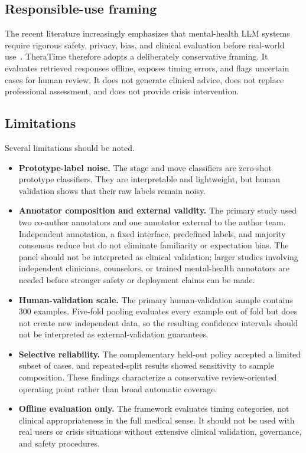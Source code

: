 \documentclass[preprint,12pt,a4paper]{elsarticle}
\begin{document}
\subsection{Responsible-use framing}

The recent literature increasingly emphasizes that mental-health LLM systems require rigorous safety, privacy, bias, and clinical evaluation before real-world use~\cite{Guo2024LLMMentalHealth,Hua2025ScopingLLMMentalHealth,Voultsiou2026LLMMentalHealth}. TheraTime therefore adopts a deliberately conservative framing. It evaluates retrieved responses offline, exposes timing errors, and flags uncertain cases for human review. It does not generate clinical advice, does not replace professional assessment, and does not provide crisis intervention.

\subsection{Limitations}

Several limitations should be noted.

\begin{itemize}
    \item \textbf{Prototype-label noise.} The stage and move classifiers are zero-shot prototype classifiers. They are interpretable and lightweight, but human validation shows that their raw labels remain noisy.
    \item \textbf{Annotator composition and external validity.} The primary study used two co-author annotators and one annotator external to the author team. Independent annotation, a fixed interface, predefined labels, and majority consensus reduce but do not eliminate familiarity or expectation bias. The panel should not be interpreted as clinical validation; larger studies involving independent clinicians, counselors, or trained mental-health annotators are needed before stronger safety or deployment claims can be made.
    \item \textbf{Human-validation scale.} The primary human-validation sample contains 300 examples. Five-fold pooling evaluates every example out of fold but does not create new independent data, so the resulting confidence intervals should not be interpreted as external-validation guarantees.
    \item \textbf{Selective reliability.} The complementary held-out policy accepted a limited subset of cases, and repeated-split results showed sensitivity to sample composition. These findings characterize a conservative review-oriented operating point rather than broad automatic coverage.
    \item \textbf{Offline evaluation only.} The framework evaluates timing categories, not clinical appropriateness in the full medical sense. It should not be used with real users or crisis situations without extensive clinical validation, governance, and safety procedures.
\end{itemize}
\end{document}
